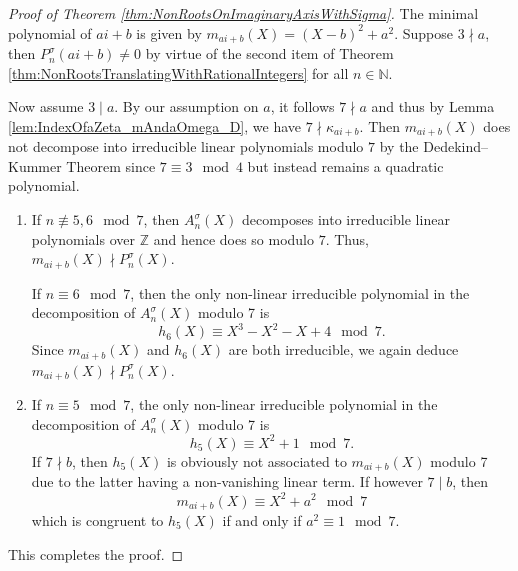 \documentclass[a4paper, 11pt, reqno]{amsart}
\theoremstyle{plain}
\theoremstyle{definition}
\theoremstyle{remark}
\numberwithin{equation}{section}
\newcommand{\Z}{\mathbb{Z}}
\newcommand{\N}{\mathbb{N}}
\begin{document}
\begin{proof}[Proof of Theorem \ref{thm:NonRootsOnImaginaryAxisWithSigma}]
    The minimal polynomial of $ai + b$ is given by $m_{ai + b}(X) = (X - b)^2 + a^2$. Suppose $3 \nmid a$, then $P_n^\sigma(ai + b) \neq 0$ by virtue of the second item of Theorem \ref{thm:NonRootsTranslatingWithRationalIntegers} for all $n \in \N$. 
     
    Now assume $3 \mid a$. By our assumption on $a$, it follows $7 \nmid a$ and thus by Lemma \ref{lem:IndexOfaZeta_mAndaOmega_D}, we have $7 \nmid \kappa_{ai + b}$. Then $m_{ai + b}(X)$ does not decompose into irreducible linear polynomials modulo $7$ by the Dedekind--Kummer Theorem since $7 \equiv 3 \mod 4$ but instead remains a quadratic polynomial.
    \begin{enumerate}
        \item If $n \not \equiv 5, 6 \mod 7$, then $A_n^\sigma(X)$ decomposes into irreducible linear polynomials over $\Z$ and hence does so modulo $7$. Thus, $m_{ai + b}(X) \nmid P_n^\sigma(X)$.

        If $n \equiv 6 \mod 7$, then the only non-linear irreducible polynomial in the decomposition of $A_n^\sigma(X)$ modulo 7 is
        \[h_6(X) \equiv X^3 - X^2 - X + 4 \mod 7.\]
        Since $m_{ai +b}(X)$ and $h_6(X)$ are both irreducible, we again deduce $m_{ai+b}(X) \nmid P_n^\sigma(X)$.
        \item If $n \equiv 5 \mod 7$, the only non-linear irreducible polynomial in the decomposition of $A_n^\sigma(X)$ modulo 7 is
        \[h_5(X) \equiv X^2 + 1 \mod 7.\]
        If $7 \nmid b$, then $h_5(X)$ is obviously not associated to $m_{ai + b}(X)$ modulo 7 due to the latter having a non-vanishing linear term. If however $7 \mid b$, then
        \[m_{ai + b}(X) \equiv X^2 + a^2 \mod 7\]
        which is congruent to $h_5(X)$ if and only if $a^2 \equiv 1 \mod 7$.
    \end{enumerate}
    This completes the proof.
\end{proof}

\end{document}

